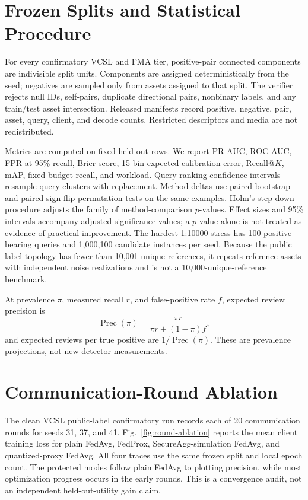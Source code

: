 \documentclass[journal]{IEEEtran}
\begin{document}
\section{Frozen Splits and Statistical Procedure}

For every confirmatory VCSL and FMA tier, positive-pair connected components are indivisible split units. Components are assigned deterministically from the seed; negatives are sampled only from assets assigned to that split. The verifier rejects null IDs, self-pairs, duplicate directional pairs, nonbinary labels, and any train/test asset intersection. Released manifests record positive, negative, pair, asset, query, client, and decode counts. Restricted descriptors and media are not redistributed.

Metrics are computed on fixed held-out rows. We report PR-AUC, ROC-AUC, FPR at 95\% recall, Brier score, 15-bin expected calibration error, Recall@$K$, mAP, fixed-budget recall, and workload. Query-ranking confidence intervals resample query clusters with replacement. Method deltas use paired bootstrap and paired sign-flip permutation tests on the same examples. Holm's step-down procedure adjusts the family of method-comparison $p$-values. Effect sizes and 95\% intervals accompany adjusted significance values; a $p$-value alone is not treated as evidence of practical improvement. The hardest 1:10000 stress has 100 positive-bearing queries and 1,000,100 candidate instances per seed. Because the public label topology has fewer than 10,001 unique references, it repeats reference assets with independent noise realizations and is not a 10,000-unique-reference benchmark.

At prevalence $\pi$, measured recall $r$, and false-positive rate $f$, expected review precision is
\begin{equation}
\operatorname{Prec}(\pi)=\frac{\pi r}{\pi r+(1-\pi)f},
\end{equation}
and expected reviews per true positive are $1/\operatorname{Prec}(\pi)$. These are prevalence projections, not new detector measurements.

\section{Communication-Round Ablation}

The clean VCSL public-label confirmatory run records each of 20 communication
rounds for seeds 31, 37, and 41. Fig.~\ref{fig:round-ablation} reports the mean
client training loss for plain FedAvg, FedProx, SecureAgg-simulation FedAvg,
and quantized-proxy FedAvg. All four traces use the same frozen split and local
epoch count. The protected modes follow plain FedAvg to plotting precision,
while most optimization progress occurs in the early rounds. This is a
convergence audit, not an independent held-out-utility gain claim.
\end{document}
